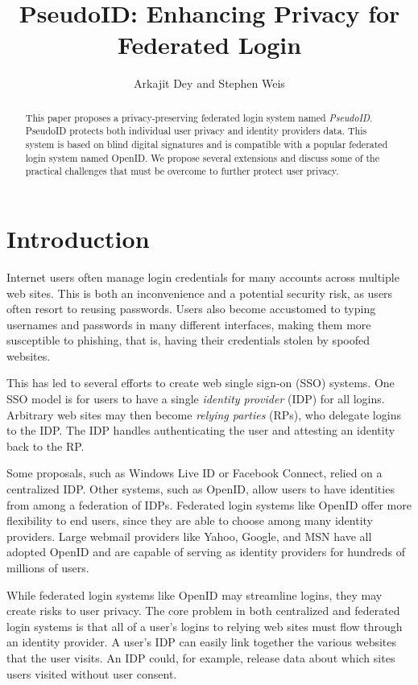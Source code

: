 \documentclass{llncs}
\title{PseudoID: Enhancing Privacy for Federated Login}
\author{Arkajit Dey\inst{1} and Stephen Weis\inst{2}}
\institute{Massachusetts Institute of Technology, Cambridge, MA, USA 02139
\and
Google Inc., Mountain View, CA, USA 94043}
\begin{document}
\maketitle

\begin{abstract}
  This paper proposes a privacy-preserving federated login system
  named \emph{PseudoID}. PseudoID protects both individual user
  privacy and identity providers data. This system is based on blind
  digital signatures and is compatible with a popular federated login
  system named OpenID. We propose several extensions and discuss some
  of the practical challenges that must be overcome to further protect
  user privacy.
\end{abstract}

\section{Introduction}
\label{sec:intro}

Internet users often manage login credentials for many accounts across
multiple web sites. This is both an inconvenience and a potential
security risk, as users often resort to reusing passwords. Users also
become accustomed to typing usernames and passwords in many different
interfaces, making them more susceptible to phishing, that is, having
their credentials stolen by spoofed websites.

This has led to several efforts to create web single sign-on (SSO)
systems. One SSO model is for users to have a single \emph{identity
  provider} (IDP) for all logins. Arbitrary web sites may then become
\emph{relying parties} (RPs), who delegate logins to the IDP. The IDP
handles authenticating the user and attesting an identity back to the
RP.

Some proposals, such as Windows Live ID or Facebook
Connect, relied on a centralized IDP. Other systems,
such as OpenID, allow users to have identities from among a
federation of IDPs. Federated login systems like OpenID offer more
flexibility to end users, since they are able to choose among many
identity providers. Large webmail providers like Yahoo, Google, and
MSN have all adopted OpenID \cite{Yah08,Sac08,WLOP08} and are capable of
serving as identity providers for hundreds of millions of users.

While federated login systems like OpenID may streamline logins, they
may create risks to user privacy. The core problem in both centralized
and federated login systems is that all of a user's logins to relying
web sites must flow through an identity provider. A user's IDP can
easily link together the various websites that the user visits. An
IDP could, for example, release data about which sites users visited
without user consent.
\end{document}
